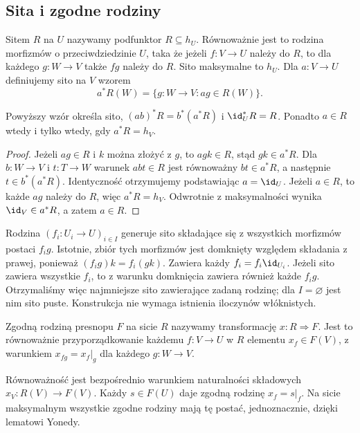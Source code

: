 \subsection{Sita i zgodne rodziny}

\begin{definicja}[Sito]\label{cat:def:sieve}
Sitem $R$ na $U$ nazywamy podfunktor $R\subseteq h_U$. Równoważnie jest to rodzina morfizmów o przeciwdziedzinie $U$, taka że jeżeli $f:V\to U$ należy do $R$, to dla każdego $g:W\to V$ także $fg$ należy do $R$.
Sito maksymalne to $h_U$. Dla $a:V\to U$ definiujemy sito na $V$ wzorem
\[
 a^*R(W)=\{g:W\to V:ag\in R(W)\}.
\]
\end{definicja}

\begin{stwierdzenie}\label{cat:prop:sieve-pullback}
Powyższy wzór określa sito, $(ab)^*R=b^*(a^*R)$ i $\id_U^*R=R$. Ponadto $a\in R$ wtedy i tylko wtedy, gdy $a^*R=h_V$.
\end{stwierdzenie}
\begin{proof}
Jeżeli $ag\in R$ i $k$ można złożyć z $g$, to $agk\in R$, stąd $gk\in a^*R$. Dla $b:W\to V$ i $t:T\to W$ warunek $abt\in R$ jest równoważny $bt\in a^*R$, a następnie $t\in b^*(a^*R)$. Identyczność otrzymujemy podstawiając $a=\id_U$. Jeżeli $a\in R$, to każde $ag$ należy do $R$, więc $a^*R=h_V$. Odwrotnie z maksymalności wynika $\id_V\in a^*R$, a zatem $a\in R$.
\end{proof}

Rodzina $(f_i:U_i\to U)_{i\in I}$ generuje sito składające się z wszystkich morfizmów postaci $f_i g$. Istotnie, zbiór tych morfizmów jest domknięty względem składania z prawej, ponieważ $(f_i g)k=f_i(gk)$. Zawiera każdy $f_i=f_i\id_{U_i}$. Jeżeli sito zawiera wszystkie $f_i$, to z warunku domknięcia zawiera również każde $f_i g$. Otrzymaliśmy więc najmniejsze sito zawierające zadaną rodzinę; dla $I=\varnothing$ jest nim sito puste. Konstrukcja nie wymaga istnienia iloczynów włóknistych.

\begin{center}
\end{center}

\begin{definicja}\label{cat:def:matching-family}
Zgodną rodziną presnopu $F$ na sicie $R$ nazywamy transformację $x:R\Rightarrow F$. Jest to równoważnie przyporządkowanie każdemu $f:V\to U$ w $R$ elementu $x_f\in F(V)$, z warunkiem $x_{fg}=x_f|_g$ dla każdego $g:W\to V$.
\end{definicja}
Równoważność jest bezpośrednio warunkiem naturalności składowych $x_V:R(V)\to F(V)$. Każdy $s\in F(U)$ daje zgodną rodzinę $x_f=s|_f$. Na sicie maksymalnym wszystkie zgodne rodziny mają tę postać, jednoznacznie, dzięki lematowi Yonedy.

